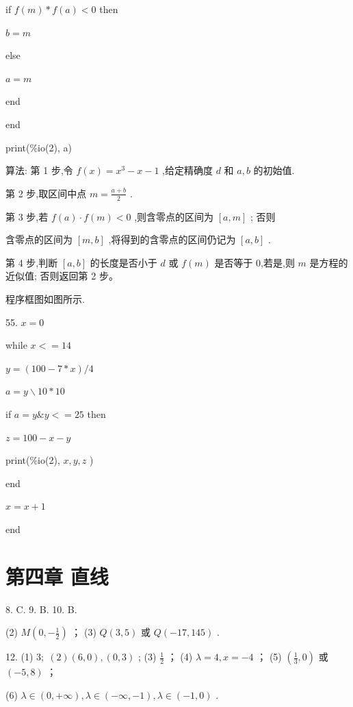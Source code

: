 \documentclass[10pt]{article}
\begin{document}
if \(f\left( m\right)  * f\left( a\right)  < 0\) then

\(b = m\)

else

\(a = m\)

end

end

print(\%io(2), a)

算法: 第 1 步,令 \(f\left( x\right)  = {x}^{3} - x - 1\) ,给定精确度 \(d\) 和 \(a,b\) 的初始值.

第 2 步,取区间中点 \(m = \frac{a + b}{2}\) .

第 3 步,若 \(f\left( a\right)  \cdot  f\left( m\right)  < 0\) ,则含零点的区间为 \(\left\lbrack  {a,m}\right\rbrack\) ; 否则

含零点的区间为 \(\left\lbrack  {m,b}\right\rbrack\) ,将得到的含零点的区间仍记为 \(\left\lbrack  {a,b}\right\rbrack\) .

第 4 步,判断 \(\left\lbrack  {a,b}\right\rbrack\) 的长度是否小于 \(d\) 或 \(f\left( m\right)\) 是否等于 0,若是,则 \(m\) 是方程的近似值; 否则返回第 2 步。

程序框图如图所示.

55. \(x = 0\)

while \(x <  = {14}\)

\(y = \left( {{100} - 7 * x}\right) /4\)

\(a = y \smallsetminus  {10} * {10}\)

if \(a = y\& y <  = {25}\) then

\(z = {100} - x - y\)

print(\%io(2), \(x,y,z\) )

end

\(x = x + 1\)

end

\section*{第四章 直线}

8. C. 9. B. 10. B.

(2) \(M\left( {0, - \frac{1}{2}}\right)\) ； (3) \(Q\left( {3,5}\right)\) 或 \(Q\left( {-{17},{145}}\right)\) .

12. (1) \(3;\;\left( 2\right) \left( {6,0}\right) ,\left( {0,3}\right)\) ; (3) \(\frac{1}{2}\) ； (4) \(\lambda  = 4,x =  - 4\) ； (5) \(\left( {\frac{1}{3},0}\right)\) 或 \(\left( {-5,8}\right)\) ；

(6) \(\lambda  \in  \left( {0, + \infty }\right) ,\lambda  \in  \left( {-\infty , - 1}\right) ,\lambda  \in  \left( {-1,0}\right)\) .
\end{document}
